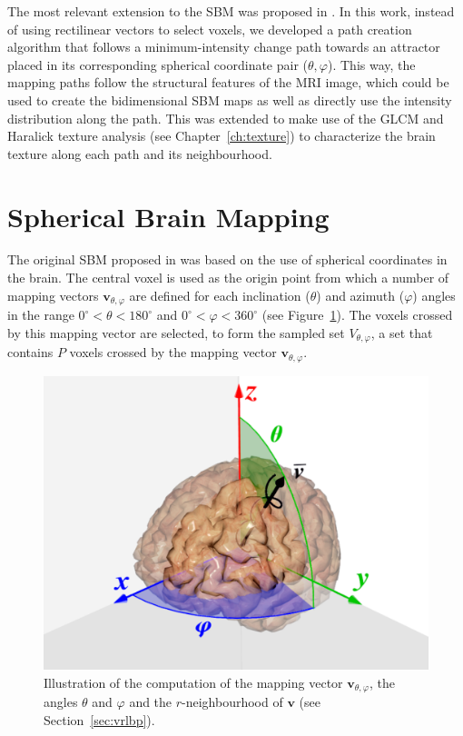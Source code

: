 The most relevant extension to the \ac{SBM} was proposed in \cite{Martinez-Murcia2016}. In this work, instead of using rectilinear vectors to select voxels, we developed a path creation algorithm that follows a minimum-intensity change path towards an attractor placed in its corresponding spherical coordinate pair ($\theta,\varphi$). This way, the mapping paths follow the structural features of the \ac{MRI} image, which could be used to create the bidimensional \ac{SBM} maps as well as directly use the intensity distribution along the path. This was extended to make use of the \ac{GLCM} and Haralick texture analysis (see Chapter~\ref{ch:texture}) to characterize the brain texture along each path and its neighbourhood. 


\section{Spherical Brain Mapping}\label{sec:mapping}
The original \ac{SBM} proposed in \cite{Martinez-Murcia2014225,Martinez-Murcia2015} was based on the use of spherical coordinates in the brain. The central voxel is used as the origin point from which a number of mapping vectors $\mathbf{v}_{\theta,\varphi}$ are defined for each inclination ($\theta$) and azimuth ($\varphi$) angles in the range $0^{\circ}<\theta<180^{\circ}$ and $0^{\circ}<\varphi<360^{\circ}$ (see Figure~\ref{fig:brainmapping}). The voxels crossed by this mapping vector are selected, to form the sampled set $V_{\theta,\varphi}$, a set that contains $P$ voxels crossed by the mapping vector $\mathbf{v}_{\theta,\varphi}$.

\begin{figure}[htp]
	\centering
	\includegraphics[width=0.7\columnwidth]{Graphics/ch6/02-projection}
	\caption{Illustration of the computation of the mapping vector $\mathbf{v}_{\theta,\varphi}$, the angles $\theta$ and $\varphi$ and the $r$-neighbourhood of $\mathbf{v}$ (see Section~\ref{sec:vrlbp}).}
	\label{fig:brainmapping}
\end{figure}

